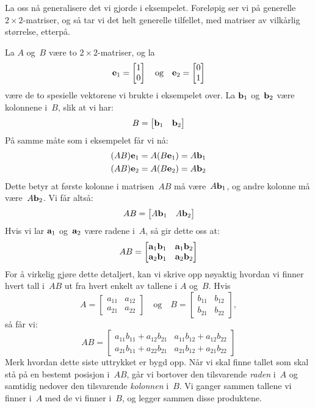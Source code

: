 La oss nå generalisere det vi gjorde i eksempelet.  Foreløpig ser vi
på generelle $2 \times 2$-matriser, og så tar vi det helt generelle
tilfellet, med matriser av vilkårlig størrelse, etterpå.

La $A$ og~$B$ være to $2 \times 2$-matriser, og la
\[
\mathbf{e}_1 = \begin{bmatrix} 1 \\ 0 \end{bmatrix}
\quad\text{og}\quad
\mathbf{e}_2 = \begin{bmatrix} 0 \\ 1 \end{bmatrix}
\]
være de to spesielle vektorene vi brukte i eksempelet over.  La
$\mathbf{b}_1$ og~$\mathbf{b}_2$ være kolonnene i~$B$, slik at vi har:
\[
B = \begin{bmatrix} \mathbf{b}_1 & \mathbf{b}_2 \end{bmatrix}
\]
På samme måte som i eksempelet får vi nå:
\begin{align*}
(AB) \mathbf{e}_1
&= A (B \mathbf{e}_1)
 = A \mathbf{b}_1 \\
(AB) \mathbf{e}_2
&= A (B \mathbf{e}_2)
 = A \mathbf{b}_2
\end{align*}
Dette betyr at første kolonne i matrisen~$AB$ må være~$A \mathbf{b}_1$, og
andre kolonne må være~$A \mathbf{b}_2$.  Vi får altså:
\[
AB = \begin{bmatrix} A \mathbf{b}_1 & A \mathbf{b}_2 \end{bmatrix}
\]
Hvis vi lar $\mathbf{a}_1$ og~$\mathbf{a}_2$ være radene i~$A$, så gir dette oss
at:
\[
AB =
\begin{bmatrix}
\mathbf{a}_1 \mathbf{b}_1 & \mathbf{a}_1 \mathbf{b}_2 \\
\mathbf{a}_2 \mathbf{b}_1 & \mathbf{a}_2 \mathbf{b}_2
\end{bmatrix}
\]
For å virkelig gjøre dette detaljert, kan vi skrive opp nøyaktig
hvordan vi finner hvert tall i~$AB$ ut fra hvert enkelt av tallene i
$A$ og~$B$.  Hvis
\[
A =
\begin{bmatrix}
a_{11} & a_{12} \\
a_{21} & a_{22}
\end{bmatrix}
\quad\text{og}\quad
B =
\begin{bmatrix}
b_{11} & b_{12} \\
b_{21} & b_{22}
\end{bmatrix},
\]
så får vi:
\[
AB =
\begin{bmatrix}
a_{11} b_{11} + a_{12} b_{21} & a_{11} b_{12} + a_{12} b_{22} \\
a_{21} b_{11} + a_{22} b_{21} & a_{21} b_{12} + a_{21} b_{22}
\end{bmatrix}
\]
Merk hvordan dette siste uttrykket er bygd opp.  Når vi skal finne
tallet som skal stå på en bestemt posisjon i~$AB$, går vi bortover den
tilsvarende \emph{raden} i~$A$ og samtidig nedover den tilsvarende
\emph{kolonnen} i~$B$.  Vi ganger sammen tallene vi finner i~$A$ med
de vi finner i~$B$, og legger sammen disse produktene.

